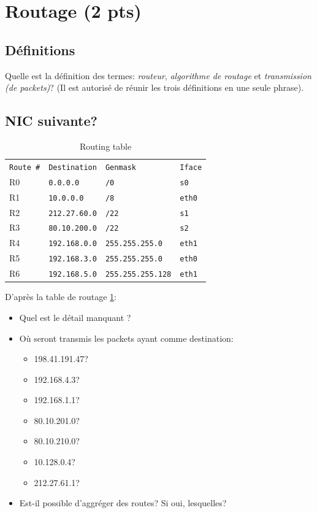 \documentclass[11pt]{article}
\begin{document}
\section{Routage (2 pts)}
	\subsection{Définitions}
		Quelle est la définition des termes: \emph{routeur}, \emph{algorithme de routage} et \emph{transmission (de packets)}? (Il est autorisé de réunir les trois définitions en une seule phrase).
\vspace{3cm}

	\subsection{NIC suivante?}
		\begin{table}[h]
		  \centering
		      \begin{tabular}{llll}
		      		\verb+Route #+	&	\verb+Destination+	& \verb+Genmask+		& \verb+Iface+ \\
		      		R0				&	\verb+0.0.0.0+ 		& \verb+/0+		 		& \verb+s0+ \\
		      		R1				&	\verb+10.0.0.0+		& \verb+/8+				& \verb+eth0+ \\
		      		R2				&	\verb+212.27.60.0+	& \verb+/22+			& \verb+s1+ \\
		      		R3				&	\verb+80.10.200.0+	& \verb+/22+			& \verb+s2+ \\
		      		R4				&	\verb+192.168.0.0+	& \verb+255.255.255.0+	& \verb+eth1+ \\
		      		R5				&	\verb+192.168.3.0+	& \verb+255.255.255.0+	& \verb+eth0+ \\
		      		R6				&	\verb+192.168.5.0+	& \verb+255.255.255.128+& \verb+eth1+ \\
		      \end{tabular}
		      \caption{Routing table}
		  \label{tab:routing}
		\end{table}

		D'après la table de routage \ref{tab:routing}:
		\begin{itemize}
			\item Quel est le détail manquant ?
			\item Où seront transmis les packets ayant comme destination:
			\begin{itemize}
				\item 198.41.191.47?
				\item 192.168.4.3?
				\item 192.168.1.1?
				\item 80.10.201.0?
				\item 80.10.210.0?
				\item 10.128.0.4?
				\item 212.27.61.1?
			\end{itemize}
			\item Est-il possible d'aggréger des routes? Si oui, lesquelles?
		\end{itemize}
\end{document}
